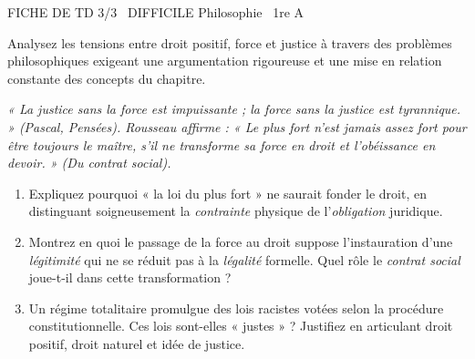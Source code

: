 \documentclass[11pt]{article}
\begin{document}
\begin{tcolorbox}[enhanced,colback=popink,colframe=popink,arc=10pt,boxrule=0pt,left=12pt,right=12pt,top=9pt,bottom=9pt]
{\color{white}\popxbold\small FICHE DE TD 3/3 \textbullet\ DIFFICILE \hfill Philosophie \textbullet\ 1re A\par}
\end{tcolorbox}
\vspace{4pt}
Analysez les tensions entre droit positif, force et justice à travers des problèmes philosophiques exigeant une argumentation rigoureuse et une mise en relation constante des concepts du chapitre.

\begin{exercice}
    \textit{« La justice sans la force est impuissante ; la force sans la justice est tyrannique. » (Pascal, \textit{Pensées}). Rousseau affirme : « Le plus fort n'est jamais assez fort pour être toujours le maître, s'il ne transforme sa force en droit et l'obéissance en devoir. » (\textit{Du contrat social}).}
    \begin{enumerate}
        \item Expliquez pourquoi « la loi du plus fort » ne saurait fonder le droit, en distinguant soigneusement la \textit{contrainte} physique de l'\textit{obligation} juridique.
        \item Montrez en quoi le passage de la force au droit suppose l'instauration d'une \textit{légitimité} qui ne se réduit pas à la \textit{légalité} formelle. Quel rôle le \textit{contrat social} joue-t-il dans cette transformation ?
        \item Un régime totalitaire promulgue des lois racistes votées selon la procédure constitutionnelle. Ces lois sont-elles « justes » ? Justifiez en articulant droit positif, droit naturel et idée de justice.
    \end{enumerate}
\end{exercice}
\end{document}
